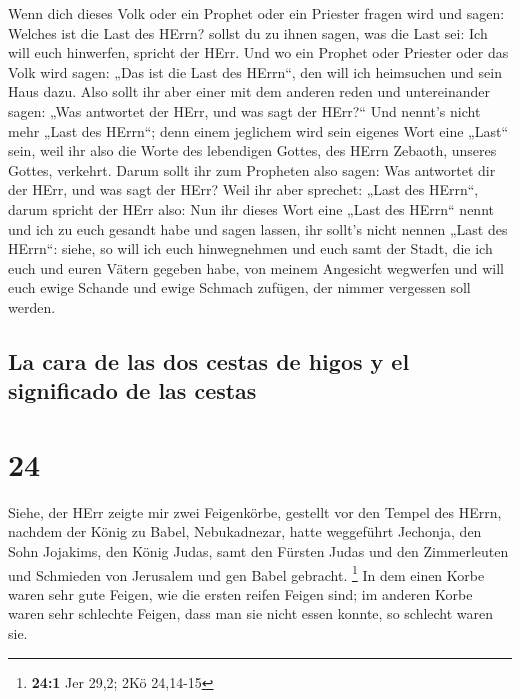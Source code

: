  Wenn dich dieses Volk oder ein Prophet oder ein Priester
fragen wird und sagen: Welches ist die Last des HErrn? sollst du zu
ihnen sagen, was die Last sei: Ich will euch hinwerfen, spricht der
HErr.  Und wo ein Prophet oder Priester oder das Volk
wird sagen: „Das ist die Last des HErrn``, den will ich heimsuchen und
sein Haus dazu.  Also sollt ihr aber einer mit dem
anderen reden und untereinander sagen: „Was antwortet der HErr, und was
sagt der HErr?{}``  Und nennt's nicht mehr „Last des
HErrn``; denn einem jeglichem wird sein eigenes Wort eine „Last`` sein,
weil ihr also die Worte des lebendigen Gottes, des HErrn Zebaoth,
unseres Gottes, verkehrt.  Darum sollt ihr zum Propheten
also sagen: Was antwortet dir der HErr, und was sagt der HErr?
 Weil ihr aber sprechet: „Last des HErrn``, darum spricht
der HErr also: Nun ihr dieses Wort eine „Last des HErrn`` nennt und ich
zu euch gesandt habe und sagen lassen, ihr sollt's nicht nennen „Last
des HErrn``:  siehe, so will ich euch hinwegnehmen und
euch samt der Stadt, die ich euch und euren Vätern gegeben habe, von
meinem Angesicht wegwerfen  und will euch ewige Schande
und ewige Schmach zufügen, der nimmer vergessen soll werden.

\hypertarget{la-cara-de-las-dos-cestas-de-higos-y-el-significado-de-las-cestas}{%
\subsection{La cara de las dos cestas de higos y el significado de las
cestas}\label{la-cara-de-las-dos-cestas-de-higos-y-el-significado-de-las-cestas}}

\hypertarget{section-23}{%
\section{24}\label{section-23}}

 Siehe, der HErr zeigte mir zwei Feigenkörbe, gestellt vor
den Tempel des HErrn, nachdem der König zu Babel, Nebukadnezar, hatte
weggeführt Jechonja, den Sohn Jojakims, den König Judas, samt den
Fürsten Judas und den Zimmerleuten und Schmieden von Jerusalem und gen
Babel gebracht. \footnote{\textbf{24:1} Jer 29,2; 2Kö 24,14-15}
 In dem einen Korbe waren sehr gute Feigen, wie die ersten
reifen Feigen sind; im anderen Korbe waren sehr schlechte Feigen, dass
man sie nicht essen konnte, so schlecht waren sie.

